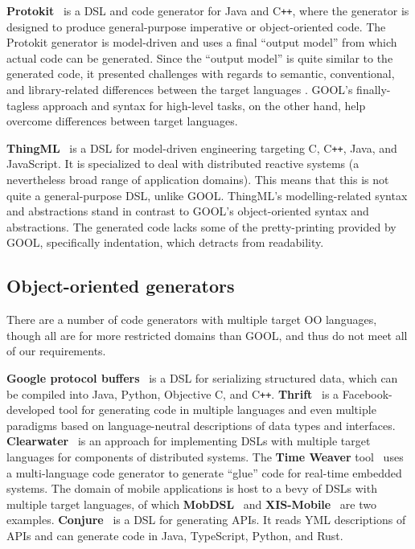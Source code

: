 \documentclass[sigplan,screen,10pt]{acmart}
\newcommand{\Cplusplus}{C\texttt{++}}
\begin{document}
\textbf{Protokit}~\cite{kovesdan2017multi} is a DSL and code generator for Java and
\Cplusplus, where the generator is designed to produce
general-purpose imperative or object-oriented code. The Protokit generator is
model-driven and uses a final ``output model'' from which actual code can be
generated. Since the ``output model'' is quite similar to the generated
code, it presented challenges with regards to semantic, conventional, and
library-related differences between the target languages
\cite{kovesdan2017multi}. GOOL's finally-tagless approach and syntax for
high-level tasks, on the other hand, help overcome differences between
target languages.

\textbf{ThingML}~\cite{harrand2016thingml} is a DSL for model-driven engineering
targeting C, \Cplusplus, Java, and JavaScript. It is specialized to deal with
distributed reactive systems (a nevertheless broad range of application domains).
This means that this is not quite a general-purpose DSL, unlike GOOL.
ThingML's modelling-related syntax and abstractions stand in contrast to GOOL's
object-oriented syntax and abstractions. The generated code lacks some of the
pretty-printing provided by GOOL, specifically indentation, which detracts from
readability.

\subsection{Object-oriented generators}

There are a number of code generators with multiple target OO languages,
though all are for more restricted domains than GOOL, and thus do not meet all
of our requirements.

\textbf{Google protocol buffers}~\cite{Protobuf} is a DSL for serializing
structured data, which can be compiled into Java, Python, Objective C, and
\Cplusplus.  \textbf{Thrift}~\cite{slee2007thrift} is a Facebook-developed tool
for generating code in multiple languages and even multiple paradigms based on
language-neutral descriptions of data types and interfaces.
\textbf{Clearwater}~\cite{swint2005clearwater} is an approach for implementing
DSLs with multiple target languages for components of distributed systems.  The
\textbf{Time Weaver} tool~\cite{de2004glue} uses a multi-language code
generator to generate ``glue'' code for real-time embedded systems.  The domain
of mobile applications is host to a bevy of DSLs with multiple target
languages, of which \textbf{MobDSL}~\cite{kramer2010mobdsl} and
\textbf{XIS-Mobile}~\cite{ribeiro2014xis} are two examples.
\textbf{Conjure}~\cite{Conjure} is a DSL for generating APIs. It reads YML
descriptions of APIs and can generate code in Java, TypeScript, Python, and
Rust.
\end{document}
